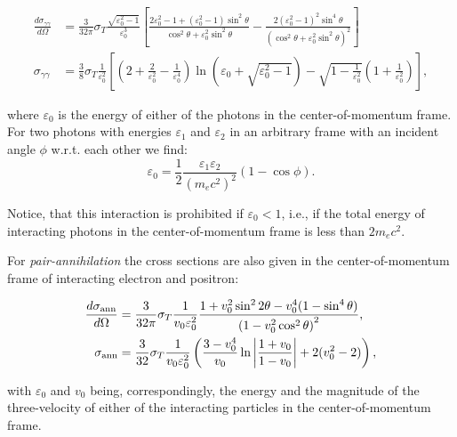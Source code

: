 \begin{equation}
    \begin{aligned}
        \frac{d \sigma_{\gamma\gamma}}{d\Omega} &= \frac{3}{32\pi} \sigma_T 
            \frac{\sqrt{\varepsilon_0^2-1}}{\varepsilon_0^3}
            \left[
                \frac{2 \varepsilon_0^2 -1 + (\varepsilon_0^2 - 1)\sin^2{\theta}}{\cos^2{\theta} + \varepsilon_0^2\sin^2{\theta}}
                - \frac{2(\varepsilon_0^2 - 1)^2\sin^4{\theta}}{\left(\cos^2{\theta}+\varepsilon_0^2 \sin^2{\theta}\right)^2}
            \right] \\
        \sigma_{\gamma\gamma} &= \frac{3}{8}\sigma_T \frac{1}{\varepsilon_0^2}\left[
            \left(2 + \frac{2}{\varepsilon_0^2} - \frac{1}{\varepsilon_0^4}\right)\ln{\left(\varepsilon_0 + \sqrt{\varepsilon_0^2 - 1}\right)} - 
            \sqrt{1 - \frac{1}{\varepsilon_0^2}}\left(1 + \frac{1}{\varepsilon_0^2}\right)
        \right],
    \end{aligned}
\end{equation}

\noindent where $\varepsilon_0$ is the energy of either of the photons in the center-of-momentum frame. For two photons with energies $\varepsilon_1$ and $\varepsilon_2$ in an arbitrary frame with an incident angle $\phi$ w.r.t. each other we find: 
\begin{equation}
    \varepsilon_0 = \frac{1}{2}\frac{\varepsilon_1 \varepsilon_2}{(m_e c^2)^2}\left(1-\cos{\phi}\right).
\end{equation}

\noindent Notice, that this interaction is prohibited if $\varepsilon_0 < 1$, i.e., if the total energy of interacting photons in the center-of-momentum frame is less than $2m_e c^2$.

For \emph{pair-annihilation} the cross sections are also given in the center-of-momentum frame of interacting electron and positron:

\begin{equation}
    \begin{aligned}
        \frac{d \sigma_{\rm ann}}{d\Omega} &= \frac{3}{32\pi} \sigma_T \frac{1}{v_0 \varepsilon_0^2}
        \frac{1+v_0^2\sin^2{2\theta} - v_0^4(1 - \sin^4{\theta})}{\left(1 - v_0^2\cos^2{\theta}\right)^2 },\\
        \sigma_{\rm ann} &= \frac{3}{32}\sigma_T \frac{1}{v_0\varepsilon_0^2}
        \left(
            \frac{3-v_0^4}{v_0} \ln{\left|\frac{1+v_0}{1-v_0}\right| + 2(v_0^2 - 2)}
        \right)
        ,
    \end{aligned}
\end{equation}

\noindent with $\varepsilon_0$ and $v_0$ being, correspondingly, the energy and the magnitude of the three-velocity of either of the interacting particles in the center-of-momentum frame.